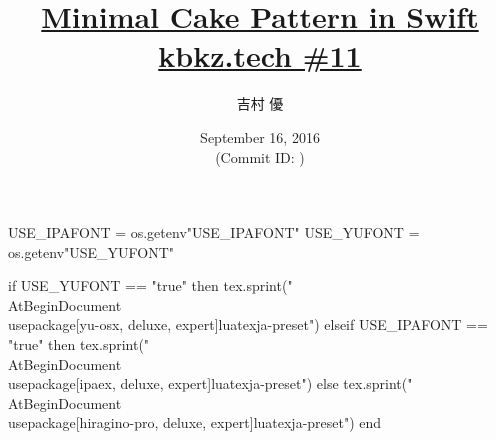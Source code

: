 \hypersetup{colorlinks,linkcolor=,urlcolor=links}

\beamertemplatenavigationsymbolsempty


\usepackage{luacode}
\usepackage{luatexja}
\usepackage{pgfpages}
\usepackage[osf]{mathpazo}

\begin{luacode*}
  USE_IPAFONT = os.getenv"USE_IPAFONT"
  USE_YUFONT = os.getenv"USE_YUFONT"
  
  if USE_YUFONT == "true" then
    tex.sprint("\\AtBeginDocument{\\usepackage[yu-osx, deluxe, expert]{luatexja-preset}}")
  elseif USE_IPAFONT == "true" then
    tex.sprint("\\AtBeginDocument{\\usepackage[ipaex, deluxe, expert]{luatexja-preset}}")
  else
    tex.sprint("\\AtBeginDocument{\\usepackage[hiragino-pro, deluxe, expert]{luatexja-preset}}")
  end
\end{luacode*}

\usepackage{epigraph}
\usepackage{etoolbox}
\usepackage{tikz}
\usepackage{framed}
\usepackage{libertine}
\usepackage{amsmath}
\usepackage{mathtools}
\usepackage{listings}

\renewcommand{\kanjifamilydefault}{\gtdefault}


\setmainfont[Numbers=OldStyle, BoldFont=Palatino Bold]{Palatino}
\setsansfont{CMU Sans Serif}
\setmonofont{CMU Typewriter Text}



\title[\href{http://qiita.com/yyu/items/193cb9fd782d226f50fc}{Minimal Cake Pattern in Swift}]{%
  \href{http://qiita.com/yyu/items/193cb9fd782d226f50fc}{Minimal Cake Pattern in Swift} \\
  {\normalsize \href{http://kbkz.connpass.com/event/37480}{kbkz.tech \#11}}
}
\author{吉村 優}
\date[September 16, 2016]{%
  September 16, 2016 \\%
  {\footnotesize (Commit ID: \GITAbrHash)}
}

